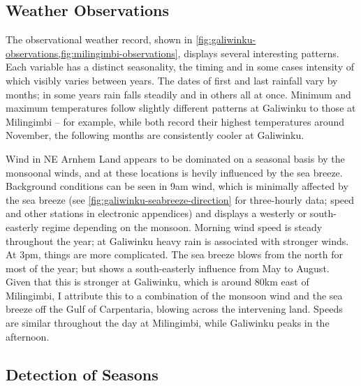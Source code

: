 \subsection{Weather Observations}

The observational weather record, shown in
\cref{fig:galiwinku-observations,fig:milingimbi-observations}, displays
several interesting patterns.  Each variable has a distinct seasonality,
the timing and in some cases intensity of which visibly varies between
years.  The dates of first and last rainfall vary by months; in some
years rain falls steadily and in others all at once.
%
Minimum and maximum temperatures follow slightly different patterns at
Galiwinku to those at Milingimbi -- for example, while both record their
highest temperatures around November, the following months are consistently
cooler at Galiwinku.

Wind in NE Arnhem Land appears to be dominated on a seasonal basis by the
monsoonal winds, and at these locations is hevily influenced by the sea
breeze.  Background conditions can be seen in 9am wind, which is minimally
affected by the sea breeze (see \cref{fig:galiwinku-seabreeze-direction}
for three-hourly data; speed and other stations in electronic appendices)
and displays a westerly or south-easterly regime depending on the monsoon.
Morning wind speed is steady throughout the year; at Galiwinku heavy rain
is associated with stronger winds.
%
At 3pm, things are more complicated.  The sea breeze blows from the north
for most of the year; but shows a south-easterly influence from May to
August.  Given that this is stronger at Galiwinku, which is around 80km
east of Milingimbi, I attribute this to a combination of the monsoon wind
and the sea breeze off the Gulf of Carpentaria, blowing across the intervening
land.  Speeds are similar throughout the day at Milingimbi, while Galiwinku
peaks in the afternoon.



\subsection{Detection of Seasons}
\label{subsec:disc-season-detection}



